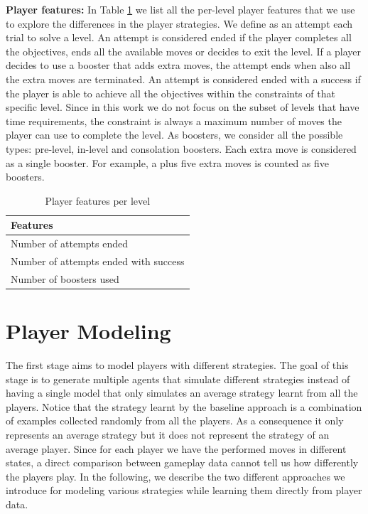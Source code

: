 \noindent
\textbf{Player features:}
In Table \ref{tab:player_features} we list all the per-level player features that we use to explore the differences in the player strategies. 
We define as an attempt each trial to solve a level. An attempt is considered ended if the player completes all the objectives, ends all the available moves or decides to exit the level. If a player decides to use a booster that adds extra moves, the attempt ends when also all the extra moves are terminated.  
An attempt is considered ended with a success if the player is able to achieve all the objectives within the constraints of that specific level. Since in this work we do not focus on the subset of levels that have time requirements, the constraint is always a maximum number of moves the player can use to complete the level. As boosters, we consider all the possible types: pre-level, in-level and consolation boosters. Each extra move is considered as a single booster. For example, a plus five extra moves is counted as five boosters. 
\begin{table}[ht]
    \centering
    \small
    \caption{Player features per level}
    \begin{tabular}{l}
    \toprule

    Features \\
    
    \midrule
    Number of attempts ended\\
    Number of attempts ended with success \\
    Number of boosters used \\
    \bottomrule
        
    \end{tabular}
    \label{tab:player_features}
\end{table}

\section{Player Modeling}
The first stage aims to model players with different strategies. The goal of this stage is to generate multiple agents that simulate different strategies instead of having a single model that only simulates an average strategy learnt from all the players. Notice that the strategy learnt by the baseline approach is a combination of examples collected randomly from all the players. As a consequence it only represents an average strategy but it does not represent the strategy of an average player. Since for each player we have the performed moves in different states, a direct comparison between gameplay data cannot tell us how differently the players play. In the following, we describe the two different approaches we introduce for modeling various strategies while learning them directly from player data. 


